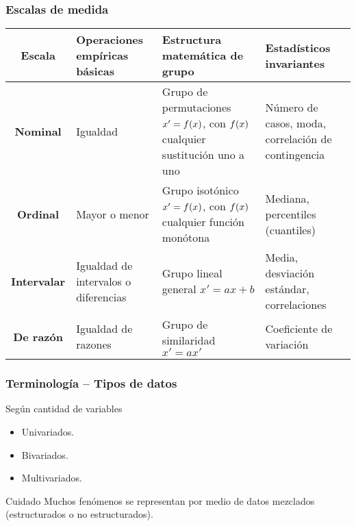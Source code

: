 \documentclass[table]{beamer}
\begin{document}
\begin{frame}
    \frametitle{Escalas de medida}
    \begin{center}
        \small
        \begin{tabular}{c|m{}|m{}|m{}}
            \hline
            Escala & Operaciones empíricas básicas & Estructura matemática de grupo & Estadísticos invariantes \\
            \hline
            \hline
            \textbf{Nominal} & Igualdad & Grupo de permutaciones $x' = f \parens{x}$, con $f \parens{x}$ cualquier sustitución uno a uno & Número de casos, moda, correlación de contingencia \\
            \hline
            \textbf{Ordinal} & Mayor o menor & Grupo isotónico $x' = f \parens{x}$, con $f \parens{x}$ cualquier función monótona & Mediana, percentiles (cuantiles) \\
            \hline
            \textbf{Intervalar} & Igualdad de intervalos o diferencias & Grupo lineal general $x' = a x + b$ & Media, desviación estándar, correlaciones \\
            \hline
            \textbf{De razón} & Igualdad de razones & Grupo de similaridad $x' = a x'$ & Coeficiente de variación \\
            \hline
        \end{tabular}
    \end{center}
\end{frame}

\begin{frame}
    \frametitle{Terminología -- Tipos de datos}
    \begin{block}{Según cantidad de variables}
        \begin{itemize}
            \item Univariados.
            \item Bivariados.
            \item Multivariados.
        \end{itemize}
    \end{block}
    \begin{alertblock}{Cuidado}
        Muchos fenómenos se representan por medio de datos mezclados (estructurados o no estructurados).
    \end{alertblock}
\end{frame}
\end{document}

